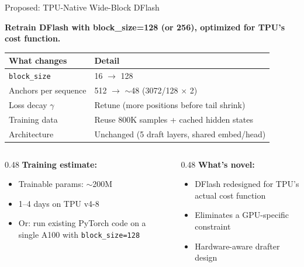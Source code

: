 \documentclass[10pt]{beamer}
\begin{document}
\begin{frame}{Proposed: TPU-Native Wide-Block DFlash}

\textbf{Retrain DFlash with block\_size=128 (or 256), optimized for TPU's cost function.}

\vspace{0.5em}
\footnotesize
\begin{tabular}{ll}
\toprule
\textbf{What changes} & \textbf{Detail} \\
\midrule
\texttt{block\_size} & 16 $\rightarrow$ 128 \\
Anchors per sequence & 512 $\rightarrow$ $\sim$48 (3072/128 $\times$ 2) \\
Loss decay $\gamma$ & Retune (more positions before tail shrink) \\
Training data & Reuse 800K samples + cached hidden states \\
Architecture & Unchanged (5 draft layers, shared embed/head) \\
\bottomrule
\end{tabular}

\vspace{0.5em}
\begin{columns}[T]
\begin{column}{0.48\textwidth}
\textbf{Training estimate:}
\begin{itemize}
  \item Trainable params: $\sim$200M
  \item 1--4 days on TPU v4-8
  \item Or: run existing PyTorch code on a single A100 with \texttt{block\_size=128}
\end{itemize}
\end{column}
\begin{column}{0.48\textwidth}
\textbf{What's novel:}
\begin{itemize}
  \item DFlash redesigned for TPU's actual cost function
  \item Eliminates a GPU-specific constraint
  \item Hardware-aware drafter design
\end{itemize}
\end{column}
\end{columns}
\end{frame}
\end{document}
